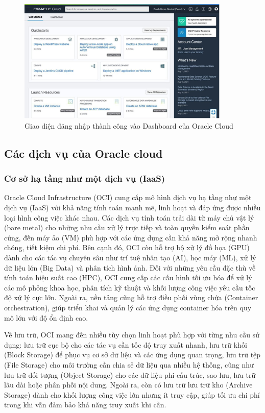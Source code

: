 \begin{myitem}
\begin{figure}[H] %
    \centering
    \includegraphics[width=0.9\textwidth]{Demo/Dang_nhap_thanh_cong.png}
    \caption{Giao diện đăng nhập thành công vào Dashboard của Oracle Cloud}
    \label{fig:cloud_intro}
\end{figure}

\end{myitem}

\subsection{Các dịch vụ của Oracle cloud}
\subsubsection{Cơ sở hạ tầng như một dịch vụ (IaaS)}
Oracle Cloud Infrastructure (OCI) cung cấp mô hình dịch vụ hạ tầng như một dịch vụ (IaaS) với khả năng tính toán mạnh mẽ, linh hoạt và đáp ứng được nhiều loại hình công việc khác nhau. Các dịch vụ tính toán trải dài từ máy chủ vật lý (bare metal) cho những nhu cầu xử lý trực tiếp và toàn quyền kiểm soát phần cứng, đến máy ảo (VM) phù hợp với các ứng dụng cần khả năng mở rộng nhanh chóng, tiết kiệm chi phí. Bên cạnh đó, OCI còn hỗ trợ bộ xử lý đồ họa (GPU) dành cho các tác vụ chuyên sâu như trí tuệ nhân tạo (AI), học máy (ML), xử lý dữ liệu lớn (Big Data) và phân tích hình ảnh. Đối với những yêu cầu đặc thù về tính toán hiệu suất cao (HPC), OCI cung cấp các cấu hình tối ưu hóa để xử lý các mô phỏng khoa học, phân tích kỹ thuật và khối lượng công việc yêu cầu tốc độ xử lý cực lớn. Ngoài ra, nền tảng cũng hỗ trợ điều phối vùng chứa (Container orchestration), giúp triển khai và quản lý các ứng dụng container hóa trên quy mô lớn với độ ổn định cao.

Về lưu trữ, OCI mang đến nhiều tùy chọn linh hoạt phù hợp với từng nhu cầu sử dụng: lưu trữ cục bộ cho các tác vụ cần tốc độ truy xuất nhanh, lưu trữ khối (Block Storage) để phục vụ cơ sở dữ liệu và các ứng dụng quan trọng, lưu trữ tệp (File Storage) cho môi trường cần chia sẻ dữ liệu qua nhiều hệ thống, cũng như lưu trữ đối tượng (Object Storage) cho các dữ liệu phi cấu trúc, sao lưu, lưu trữ lâu dài hoặc phân phối nội dung. Ngoài ra, còn có lưu trữ lưu trữ kho (Archive Storage) dành cho khối lượng công việc lớn nhưng ít truy cập, giúp tối ưu chi phí trong khi vẫn đảm bảo khả năng truy xuất khi cần.


